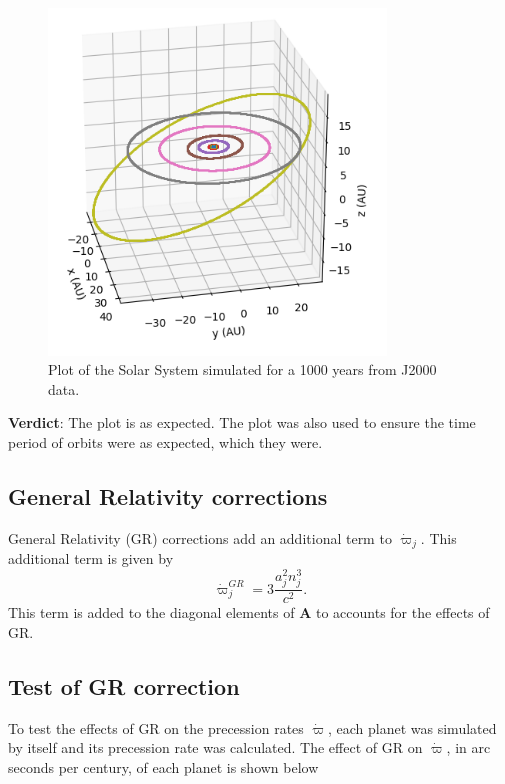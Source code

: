 \documentclass[11pt, oneside]{article}   	%
\begin{document}
\begin{figure}[!h]
\begin{center}
\includegraphics[width= 0.8\textwidth]{SolarSystem3D_rsz}
\caption[]{Plot of the Solar System simulated for a 1000 years from J2000 data.}
\label{}
\end{center}
\end{figure}

\textbf{Verdict}: The plot is as expected. The plot was also used to ensure the time period of orbits were as expected, which they were.

\subsection{General Relativity corrections}

General Relativity (GR) corrections add an additional term to $\dot{\varpi}_{j}$. This additional term is given by \cite{Adams2006}
\begin{equation}
\dot{\varpi}_{j}^{GR} = 3\frac{a_{j}^{2}n_{j}^{3}}{c^{2}}.
\end{equation}
This term is added to the diagonal elements of $\mathbf{A}$ to accounts for the effects of GR.

\subsection{Test of GR correction}
\label{GRcor}

To test the effects of GR on the precession rates $\dot{\varpi}$, each planet was simulated by itself and its precession rate was calculated. The effect of GR on $\dot{\varpi}$, in arc seconds per century, of each planet is shown below
\end{document}
